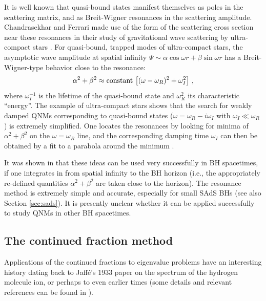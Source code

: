 \documentclass[]{iopart}
\def\be{\begin{equation}}
\def\ee{\end{equation}}
\begin{document}
It is well known that quasi-bound states manifest themselves as poles in the
scattering matrix, and as Breit-Wigner resonances in the scattering
amplitude. Chandrasekhar and Ferrari made use of the form of the scattering
cross section near these resonances in their study of gravitational wave
scattering by ultra-compact stars
\cite{ChandrasekharFerrari,Chandrasekhar:1992ey}.  For quasi-bound, trapped
modes of ultra-compact stars, the asymptotic wave amplitude at spatial
infinity $\Psi \sim \alpha \cos \omega r+\beta \sin \omega r$ has a
Breit-Wigner-type behavior close to the resonance:
%
\be
\alpha^2+\beta^2\approx{\rm constant}\,
\left[(\omega-\omega_R)^2+\omega_I^2\right]\,,
\label{breitwigner}
\ee
%
where $\omega_I^{-1}$ is the lifetime of the quasi-bound state and
$\omega_R^2$ its characteristic ``energy''.  The example of ultra-compact
stars shows that the search for weakly damped QNMs corresponding to
quasi-bound states ($\omega=\omega_R-i\omega_I$ with $\omega_I\ll \omega_R$)
is extremely simplified. One locates the resonances by looking for minima of
$\alpha^2+\beta^2$ on the $\omega=\omega_R$ line, and the corresponding
damping time $\omega_I$ can then be obtained by a fit to a parabola around the
minimum \cite{ChandrasekharFerrari,Chandrasekhar:1992ey}.

It was shown in \cite{Berti:2009wx} that these ideas can be used very
successfully in BH spacetimes, if one integrates in from spatial infinity to
the BH horizon (i.e., the appropriately re-defined quantities
$\alpha^2+\beta^2$ are taken close to the horizon). The resonance method is
extremely simple and accurate, especially for small SAdS BHs
\cite{Berti:2009wx} (see also Section \ref{sec:sads}). It is presently unclear
whether it can be applied successfully to study QNMs in other BH spacetimes.

\subsection{\label{sec:Leaver}The continued fraction method}

Applications of the continued fractions to eigenvalue problems have an
interesting history dating back to Jaff\'e's 1933 paper on the spectrum of the
hydrogen molecule ion, or perhaps to even earlier times (some details and
relevant references can be found in \cite{Starinets:2002br}).
\end{document}
